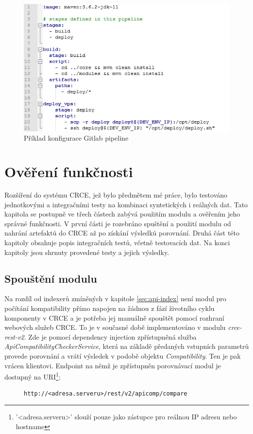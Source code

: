 \documentclass[czech,DP]{thesiskiv}
\begin{document}
\begin{figure}
	\centering
	\includegraphics[width=\linewidth]{pipeline-example}
	\caption{Příklad konfigurace Gitlab pipeline}
	\label{fig:pipeline-example}
\end{figure}



\chapter{Ověření funkčnosti}
\label{sec:testing}

Rozšíření do systému CRCE, jež bylo předmětem mé práce, bylo testováno jednotkovými a integračními testy na kombinaci syntetických i reálných dat. Tato kapitola se postupně ve třech částech zabývá použitím modulu a ověřením jeho správné funkčnosti. V první části je rozebráno spuštění a použití modulu od nahrání artefaktů do CRCE až po získání výsledků porovnání. Druhá část této kapitoly obsahuje popis integračních testů, včetně testovacích dat. Na konci kapitoly jsou shrnuty provedené testy a jejich výsledky.

\section{Spouštění modulu}

Na rozdíl od indexerů zmíněných v kapitole \ref{sec:api-index} není modul pro počítání kompatibility přímo napojen na žádnou z fází životního cyklu komponenty v CRCE a je potřeba jej manuálně spouštět pomocí rozhraní webových služeb CRCE. To je v současné době implementováno v modulu \textit{crce-rest-v2}. Zde je pomocí dependency injection zpřístupněná služba \textit{ApiCompatibilityCheckerService}, která na základě předaných vstupních parametrů provede porovnání a vrátí výsledek v podobě objektu \textit{Compatibility}. Ten je pak vrácen klientovi. Endpoint na němž je zpřístupněn porovnávací modul je dostupný na URI\footnote{'<adresa.serveru>' slouží pouze jako zástupce pro reálnou IP adresu nebo hostname}:
\begin{figure}[h]
\centering
\verb|http://<adresa.serveru>/rest/v2/apicomp/compare|
\end{figure}
\end{document}
